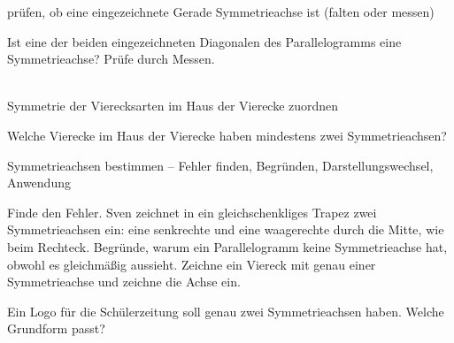 \begin{aufgabe}{prüfen, ob eine eingezeichnete Gerade Symmetrieachse ist (falten oder messen)}
\begin{teile}
\teil Ist eine der beiden eingezeichneten Diagonalen des Parallelogramms eine Symmetrieachse? Prüfe durch Messen. \\  \\ 

\end{teile}
\end{aufgabe}

\begin{aufgabe}{Symmetrie der Vierecksarten im Haus der Vierecke zuordnen}
\begin{teile}
\teil Welche Vierecke im Haus der Vierecke haben mindestens zwei Symmetrieachsen?
\end{teile}
\end{aufgabe}

\begin{aufgabe}{Symmetrieachsen bestimmen – Fehler finden, Begründen, Darstellungswechsel, Anwendung}
\begin{teile}
\teil Finde den Fehler. Sven zeichnet in ein gleichschenkliges Trapez zwei Symmetrieachsen ein: eine senkrechte und eine waagerechte durch die Mitte, wie beim Rechteck.
\teil Begründe, warum ein Parallelogramm keine Symmetrieachse hat, obwohl es gleichmäßig aussieht.
\teil Zeichne ein Viereck mit genau einer Symmetrieachse und zeichne die Achse ein.

\begin{ksys}[xmin=0,xmax=8,ymin=0,ymax=6] \end{ksys}
\teil Ein Logo für die Schülerzeitung soll genau zwei Symmetrieachsen haben. Welche Grundform passt? \\  \\  \\ 
\end{teile}
\end{aufgabe}
